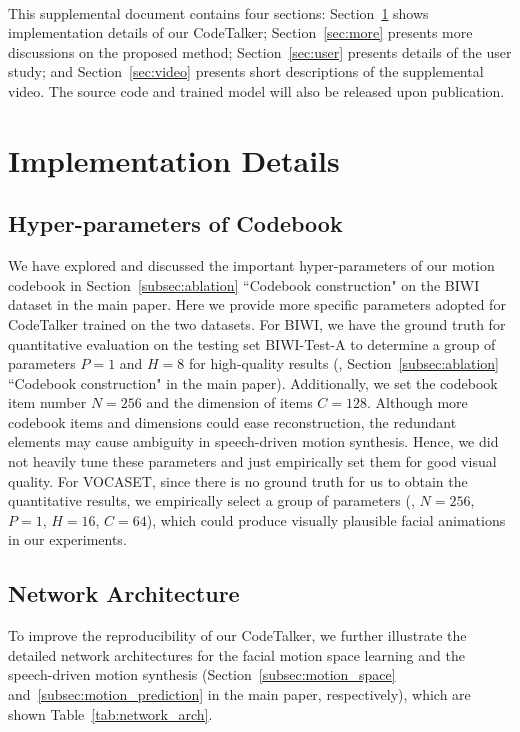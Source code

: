 

\appendix



\vspace{0.2mm}
\\

This supplemental document contains four sections: Section~\ref{sec:implementation} shows implementation details of our CodeTalker; Section~\ref{sec:more} presents more discussions on the proposed method; Section~\ref{sec:user} presents details of the user study; and Section~\ref{sec:video} presents short descriptions of the supplemental video. The source code and trained model will also be released upon publication.


\section{Implementation Details}
\label{sec:implementation}
\subsection{{Hyper-parameters of Codebook}}
We have explored and discussed the important hyper-parameters of our motion codebook in Section~\ref{subsec:ablation} ``Codebook construction" on the BIWI dataset in the main paper. Here we provide more specific parameters adopted for CodeTalker trained on the two datasets. For BIWI, we have the ground truth for quantitative evaluation on the testing set BIWI-Test-A to determine a group of parameters $P=1$ and $H=8$ for high-quality results (\ie, Section~\ref{subsec:ablation} ``Codebook construction" in the main paper). Additionally, we set the codebook item number $N=256$ and the dimension of items $C=128$. Although more codebook items and dimensions could ease reconstruction, the redundant elements may cause ambiguity in speech-driven motion synthesis. Hence, we did not heavily tune these parameters and just empirically set them for good visual quality. For VOCASET, since there is no ground truth for us to obtain the quantitative results, we empirically select a group of parameters (\ie, $N=256$, $P=1$, $H=16$, $C=64$), which could produce visually plausible facial animations in our experiments.

\subsection{Network Architecture}
To improve the reproducibility of our CodeTalker, we further illustrate the detailed network architectures for the facial motion space learning and the speech-driven motion synthesis (Section~\ref{subsec:motion_space} and~\ref{subsec:motion_prediction} in the main paper, respectively), which are shown Table~\ref{tab:network_arch}.



